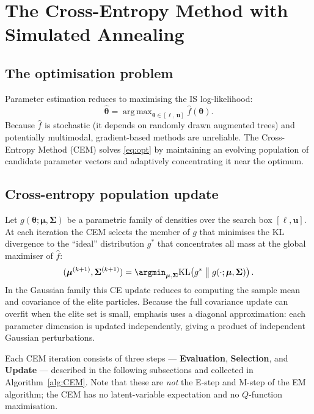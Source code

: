 \documentclass[12pt,a4paper]{article}
\newcommand{\pars}{\bm{\theta}}
\newcommand{\lb}{\bm{\ell}}
\newcommand{\ub}{\mathbf{u}}
\newcommand{\fhat}{\widehat{f}}
\newcommand{\KL}{\mathrm{KL}}
\DeclareMathOperator*{\argmax}{arg\,max}
\begin{document}
\section{The Cross-Entropy Method with Simulated Annealing}\label{sec:CEM}

\subsection{The optimisation problem}

Parameter estimation reduces to maximising the IS log-likelihood:
\begin{equation}\label{eq:opt}
  \hat{\pars} = \argmax_{\pars \in [\lb,\,\ub]} \fhat(\pars).
\end{equation}
Because $\fhat$ is stochastic (it depends on randomly drawn augmented
trees) and potentially multimodal, gradient-based methods are unreliable.
The Cross-Entropy Method (CEM) \citep{rubinstein1999cross,deBoer2005tutorial}
solves \eqref{eq:opt} by maintaining an evolving population of candidate
parameter vectors and adaptively concentrating it near the optimum.

\subsection{Cross-entropy population update}

Let $g(\pars; \bm{\mu}, \bm{\Sigma})$ be a parametric family of densities
over the search box $[\lb, \ub]$. At each iteration the CEM selects the
member of $g$ that minimises the KL divergence to the ``ideal'' distribution
$g^*$ that concentrates all mass at the global maximiser of $\fhat$:
\begin{equation}
  (\bm{\mu}^{(k+1)}, \bm{\Sigma}^{(k+1)}) = \argmin_{\bm{\mu},\bm{\Sigma}}
  \KL\!\left(g^* \;\big\|\; g(\cdot;\bm{\mu},\bm{\Sigma})\right).
\end{equation}
In the Gaussian family this CE update reduces to computing the sample mean
and covariance of the elite particles. Because the full covariance update
can overfit when the elite set is small, \textsf{emphasis} uses a
diagonal approximation: each parameter dimension is updated independently,
giving a product of independent Gaussian perturbations.

Each CEM iteration consists of three steps --- \textbf{Evaluation},
\textbf{Selection}, and \textbf{Update} --- described in the following
subsections and collected in Algorithm~\ref{alg:CEM}. Note that these are
\emph{not} the E-step and M-step of the EM algorithm; the CEM has no
latent-variable expectation and no $Q$-function maximisation.
\end{document}
